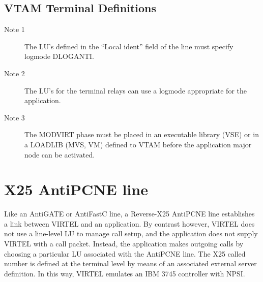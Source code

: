 \documentclass[letterpaper,10pt,english]{sphinxmanual}
\begin{document}
\begin{sphinxVerbatim}[commandchars=\\\{\}]
  
  
  
  
\end{sphinxVerbatim}


\subsection{VTAM Terminal Definitions}
\label{\detokenize{connectivity_guide:index-81}}\label{\detokenize{connectivity_guide:id39}}\begin{description}
\item[{Note 1}] \leavevmode
The LU’s defined in the “Local ident” field of the line must specify logmode DLOGANTI.

\item[{Note 2}] \leavevmode
The LU’s for the terminal relays can use a logmode appropriate for the application.

\item[{Note 3}] \leavevmode
The MODVIRT phase must be placed in an executable library (VSE) or in a LOADLIB (MVS, VM) defined to VTAM before the application major node can be activated.

\end{description}

\newpage


\section{X25 AntiPCNE line}
\label{\detokenize{connectivity_guide:x25-antipcne-line}}\label{\detokenize{connectivity_guide:index-82}}
Like an AntiGATE or AntiFastC line, a Reverse-X25 AntiPCNE line establishes a link between VIRTEL and an application. By contrast however, VIRTEL does not use a line-level LU to manage call setup, and the application does not supply VIRTEL with a call packet. Instead, the application makes outgoing calls by choosing a particular LU associated with the AntiPCNE line. The X25 called number is defined at the terminal level by means of an associated external server definition. In this way, VIRTEL emulates an IBM 3745 controller with NPSI.
\end{document}
